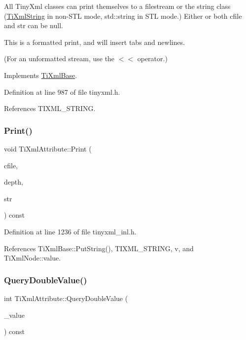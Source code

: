 All Tiny\+Xml classes can print themselves to a filestream or the string class (\hyperlink{class_ti_xml_string}{Ti\+Xml\+String} in non-\/\+S\+TL mode, std\+::string in S\+TL mode.) Either or both cfile and str can be null.

This is a formatted print, and will insert tabs and newlines.

(For an unformatted stream, use the $<$$<$ operator.) 

Implements \hyperlink{class_ti_xml_base_a0de56b3f2ef14c65091a3b916437b512}{Ti\+Xml\+Base}.



Definition at line 987 of file tinyxml.\+h.



References T\+I\+X\+M\+L\+\_\+\+S\+T\+R\+I\+NG.

\hypertarget{class_ti_xml_attribute_a5c8f72a7d1a49972434d45f4c2889e0e}{}\label{class_ti_xml_attribute_a5c8f72a7d1a49972434d45f4c2889e0e} 
\subsubsection{\texorpdfstring{Print()}{Print()}\hspace{0.1cm}{\footnotesize\ttfamily [2/2]}}
{\footnotesize\ttfamily void Ti\+Xml\+Attribute\+::\+Print (\begin{DoxyParamCaption}\item[{F\+I\+LE $\ast$}]{cfile,  }\item[{int}]{depth,  }\item[{\hyperlink{tinyxml_8h_a92bada05fd84d9a0c9a5bbe53de26887}{T\+I\+X\+M\+L\+\_\+\+S\+T\+R\+I\+NG} $\ast$}]{str }\end{DoxyParamCaption}) const}



Definition at line 1236 of file tinyxml\+\_\+inl.\+h.



References Ti\+Xml\+Base\+::\+Put\+String(), T\+I\+X\+M\+L\+\_\+\+S\+T\+R\+I\+NG, v, and Ti\+Xml\+Node\+::value.

\hypertarget{class_ti_xml_attribute_a6fa41b710c1b79de37a97004aa600c06}{}\label{class_ti_xml_attribute_a6fa41b710c1b79de37a97004aa600c06} 
\subsubsection{\texorpdfstring{Query\+Double\+Value()}{QueryDoubleValue()}}
{\footnotesize\ttfamily int Ti\+Xml\+Attribute\+::\+Query\+Double\+Value (\begin{DoxyParamCaption}\item[{double $\ast$}]{\+\_\+value }\end{DoxyParamCaption}) const}




